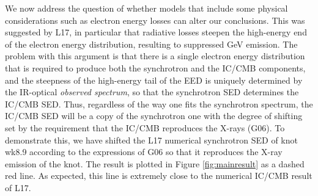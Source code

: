 \documentclass[twocolumn]{aastex61}
\begin{document}
We now address the question of whether models that include some
physical considerations such as electron energy losses can alter our
conclusions. This was suggested by L17, in particular that radiative
losses steepen the high-energy end of the electron energy
distribution, resulting to suppressed GeV emission. The problem with
this argument is that there is a single electron energy distribution
that is required to produce both the synchrotron and the IC/CMB
components, and the steepness of the high-energy tail of the EED is
uniquely determined by the IR-optical \emph{observed spectrum}, so
that the synchrotron SED determines the IC/CMB SED. Thus, regardless
of the way one fits the synchrotron spectrum, the IC/CMB SED will be a
copy of the synchrotron one with the degree of shifting set by the
requirement that the IC/CMB reproduces the X-rays (G06). To
demonstrate this, we have shifted the L17 numerical synchrotron SED of
knot wk8.9 according to the expressions of G06 so that it reproduces
the X-ray emission of the knot. The result is plotted in Figure
\ref{fig:mainresult} as a dashed red line. As expected, this line is
extremely close to the numerical IC/CMB result of L17.








\end{document}
